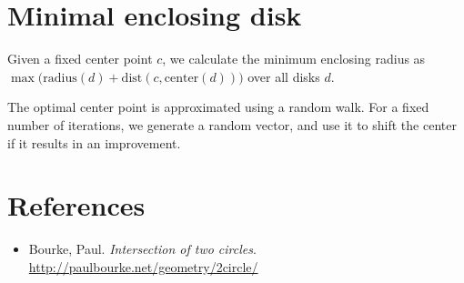 \documentclass[11pt]{article}
\begin{document}
\section{Minimal enclosing disk}

Given a fixed center point $c$, we calculate the minimum enclosing radius
as $\max \Big( \textrm{radius}(d) + \textrm{dist}(c, \textrm{center}(d)) \Big)$
over all disks $d$.

The optimal center point is approximated using a random walk.
For a fixed number of iterations, we generate a random vector,
and use it to shift the center if it results in an improvement.

\section{References}

\begin{itemize}

\item Bourke, Paul. {\it Intersection of two circles}.
\url{http://paulbourke.net/geometry/2circle/}

\end{itemize}
\end{document}
